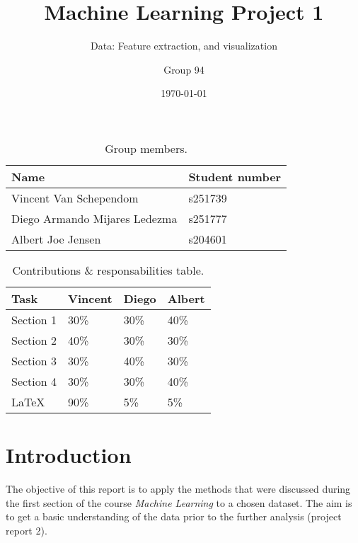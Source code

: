 \documentclass[dtu]{dtuarticle}
\title{Machine Learning Project 1}
\subtitle{Data: Feature extraction, and visualization}
\author{Group 94}
\date{\today}
\begin{document}
	\maketitle

	\begin{table}[h!]
		\renewcommand{\arraystretch}{1.1} %
		\centering
		\begin{tabular}{l | l}
			\textbf{Name}                 & \textbf{Student number} \\ \hline\hline
			Vincent Van Schependom        & s251739                 \\ \hline
			Diego Armando Mijares Ledezma & s251777                 \\ \hline
			Albert Joe Jensen             & s204601
		\end{tabular}
		\caption{Group members.}
		\label{table:members}
	\end{table}

	\begin{table}[h!]
		\renewcommand{\arraystretch}{1.1} %
		\centering
		\begin{tabular}{l | *{3}{|l}}
			\textbf{Task} & \textbf{Vincent} & \textbf{Diego} & \textbf{Albert} \\ \hline\hline
			Section 1     & 30\%             & 30\%           & 40\%            \\ \hline
			Section 2     & 40\%             & 30\%           & 30\%            \\ \hline
			Section 3     & 30\%             & 40\%           & 30\%            \\ \hline
			Section 4     & 30\%             & 30\%           & 40\%			\\ \hline
			\LaTeX        & 90\%             & 5\%           & 5\%
		\end{tabular}
		\caption{Contributions \& responsabilities table.}
		\label{table:contributions}
	\end{table}

	\section*{Introduction}

	The objective of this report is to apply the methods that were discussed during the first
	section of the course \textit{Machine Learning} \cite{book} to a chosen dataset. The aim is to get
	a basic understanding of the data prior to the further analysis (project report 2).
\end{document}
